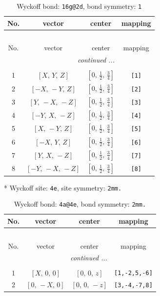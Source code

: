 \documentclass[fleqn,8pt]{jsarticle}
\begin{document}
\begin{longtable}{cccc}
\caption{Wyckoff bond: {\tt 16g@2d}, bond symmetry: {\tt 1}}
 \\
 \hline \hline
No. & vector & center & mapping \\ \hline \endfirsthead

\multicolumn{3}{l}{\tablename\ \thetable{}} \\
 \hline \hline
No. & vector & center & mapping \\ \hline \endhead

 \hline \hline
\multicolumn{3}{r}{\footnotesize\it continued ...} \\ \endfoot

 \hline \hline
\multicolumn{3}{r}{} \\ \endlastfoot

1 & $\left[ X,\, Y,\, Z \right]$ & $\left[ 0,\, \frac{1}{2},\, \frac{3}{4} \right]$ & {\tt [1]} \\ \hline
2 & $\left[ - X,\, - Y,\, Z \right]$ & $\left[ 0,\, \frac{1}{2},\, \frac{3}{4} \right]$ & {\tt [2]} \\ \hline
3 & $\left[ Y,\, - X,\, - Z \right]$ & $\left[ 0,\, \frac{1}{2},\, \frac{3}{4} \right]$ & {\tt [3]} \\ \hline
4 & $\left[ - Y,\, X,\, - Z \right]$ & $\left[ 0,\, \frac{1}{2},\, \frac{3}{4} \right]$ & {\tt [4]} \\ \hline
5 & $\left[ X,\, - Y,\, Z \right]$ & $\left[ 0,\, \frac{1}{2},\, \frac{3}{4} \right]$ & {\tt [5]} \\ \hline
6 & $\left[ - X,\, Y,\, Z \right]$ & $\left[ 0,\, \frac{1}{2},\, \frac{3}{4} \right]$ & {\tt [6]} \\ \hline
7 & $\left[ Y,\, X,\, - Z \right]$ & $\left[ 0,\, \frac{1}{2},\, \frac{3}{4} \right]$ & {\tt [7]} \\ \hline
8 & $\left[ - Y,\, - X,\, - Z \right]$ & $\left[ 0,\, \frac{1}{2},\, \frac{3}{4} \right]$ & {\tt [8]} \\
\end{longtable}
* Wyckoff site: {\tt 4e}, site symmetry: {\tt 2mm.}
\renewcommand{\arraystretch}{1.2}
\begin{longtable}{cccc}
\caption{Wyckoff bond: {\tt 4a@4e}, bond symmetry: {\tt 2mm.}}
 \\
 \hline \hline
No. & vector & center & mapping \\ \hline \endfirsthead

\multicolumn{3}{l}{\tablename\ \thetable{}} \\
 \hline \hline
No. & vector & center & mapping \\ \hline \endhead

 \hline \hline
\multicolumn{3}{r}{\footnotesize\it continued ...} \\ \endfoot

 \hline \hline
\multicolumn{3}{r}{} \\ \endlastfoot

1 & $\left[ X,\, 0,\, 0 \right]$ & $\left[ 0,\, 0,\, z \right]$ & {\tt [1,-2,5,-6]} \\ \hline
2 & $\left[ 0,\, - X,\, 0 \right]$ & $\left[ 0,\, 0,\, - z \right]$ & {\tt [3,-4,-7,8]} \\
\end{longtable}
\end{document}
